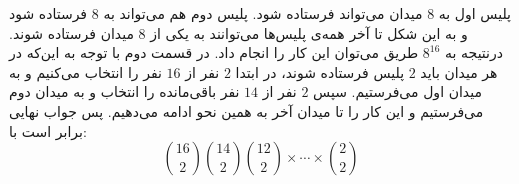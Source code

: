         \p
پلیس اول به
$8$
میدان می‌تواند فرستاده شود. پلیس دوم هم می‌تواند به
$8$
فرستاده شود و به این شکل تا آخر همه‌ی پلیس‌ها می‌توانند به یکی از
$8$
میدان فرستاده شوند. درنتیجه به
$8^{16}$
طریق می‌توان این کار را انجام داد. در قسمت دوم با توجه به این‌که در هر میدان باید
$2$
پلیس فرستاده شوند، در ابتدا
$2$
نفر از
$16$
نفر را انتخاب می‌کنیم و به میدان اول می‌فرستیم. سپس
$2$
نفر از
$14$
نفر باقی‌مانده را انتخاب و به میدان دوم می‌فرستیم و این کار را تا میدان آخر به همین نحو ادامه می‌دهیم. پس جواب نهایی برابر است با:
$$\binom{16}{2}\binom{14}{2}\binom{12}{2}\times \cdots \times \binom{2}{2}$$
